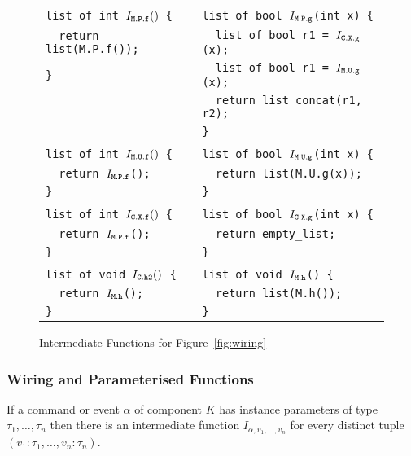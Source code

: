 \documentclass[11pt,letterpaper]{article}
\newcommand{\code}[1]{{\tt #1}}
\begin{document}
\begin{figure}
\begin{tabular}{ll}
\tt list of int $I_\code{M.P.f}()$ \{ & \tt list of bool $I_\code{M.P.g}$(int x) \{ \\
\tt \ \ return list(M.P.f());         & \tt \ \ list of bool r1 = $I_\code{C.X.g}$(x); \\
\tt \}                                & \tt \ \ list of bool r1 = $I_\code{M.U.g}$(x); \\
                                      & \tt \ \ return list\_concat(r1, r2); \\
                                      & \tt \} \\
\\
\tt list of int $I_\code{M.U.f}()$ \{ & \tt list of bool $I_\code{M.U.g}$(int x) \{ \\
\tt \ \ return $I_\code{M.P.f}$();    & \tt \ \ return list(M.U.g(x)); \\
\tt \}                                & \tt \} \\
\\
\tt list of int $I_\code{C.X.f}()$ \{ & \tt list of bool $I_\code{C.X.g}$(int x) \{ \\
\tt \ \ return $I_\code{M.P.f}$();    & \tt \ \ return empty\_list; \\
\tt \}                                & \tt \} \\
\\
\tt list of void $I_\code{C.h2}()$ \{ & \tt list of void $I_\code{M.h}$() \{ \\
\tt \ \ return $I_\code{M.h}$();      & \tt \ \ return list(M.h()); \\
\tt \}                                & \tt \} \\
\end{tabular}
\caption{Intermediate Functions for Figure~\ref{fig:wiring}}
\label{fig:wiring-fns}
\end{figure}

\subsubsection{Wiring and Parameterised Functions}
\label{sec:wiring-parms}

If a command or event $\alpha$ of component $K$ has instance
parameters of type $\tau_1, \ldots, \tau_n$ then there is an
intermediate function $I_{\alpha,v_1,\ldots,v_n}$ for every distinct
tuple $(v_1:\tau_1, \ldots, v_n:\tau_n)$.
\end{document}

